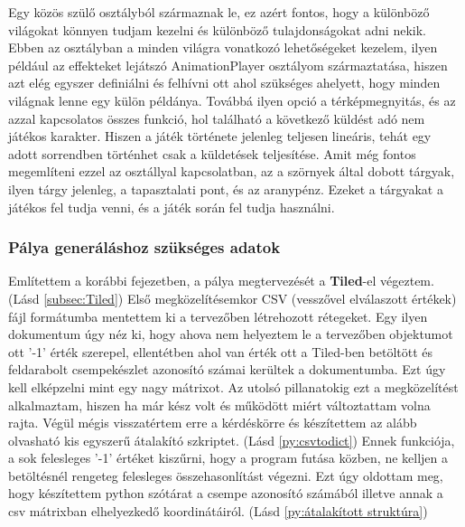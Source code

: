 Egy közös szülő osztályból származnak le, ez azért fontos, hogy a különböző világokat könnyen tudjam kezelni és különböző tulajdonságokat adni nekik. Ebben az osztályban a minden világra vonatkozó lehetőségeket kezelem, ilyen például az effekteket lejátszó AnimationPlayer osztályom származtatása, hiszen azt elég egyszer definiálni és felhívni ott ahol szükséges ahelyett, hogy minden világnak lenne egy külön példánya. Továbbá ilyen opció a térképmegnyitás, és az azzal kapcsolatos összes funkció, hol található a következő küldést adó nem játékos karakter. Hiszen a játék története jelenleg teljesen lineáris, tehát egy adott sorrendben történhet csak a küldetések teljesítése. Amit még fontos megemlíteni ezzel az osztállyal kapcsolatban, az a szörnyek által dobott tárgyak, ilyen tárgy jelenleg, a tapasztalati pont, és az aranypénz. Ezeket a tárgyakat a játékos fel tudja venni, és a játék során fel tudja használni.  

\subsubsection{Pálya generáláshoz szükséges adatok}

Említettem a korábbi fejezetben, a pálya megtervezését a \textbf{Tiled}-el végeztem. (Lásd \ref{subsec:Tiled}) 
Első megközelítésemkor CSV (vesszővel elválaszott értékek) fájl formátumba mentettem ki a tervezőben létrehozott rétegeket. Egy ilyen dokumentum úgy néz ki, hogy ahova nem helyeztem le a tervezőben objektumot ott '-1' érték szerepel, ellentétben ahol van érték ott a Tiled-ben betöltött és feldarabolt csempekészlet azonosító számai kerültek a dokumentumba. Ezt úgy kell elképzelni mint egy nagy mátrixot. Az utolsó pillanatokig ezt a megközelítést alkalmaztam, hiszen ha már kész volt és működött miért változtattam volna rajta. Végül mégis visszatértem erre a kérdéskörre és készítettem az alább olvasható kis egyszerű átalakító szkriptet. (Lásd \ref{py:csvtodict}) Ennek funkciója, a sok felesleges '-1' értéket kiszűrni, hogy a program futása közben, ne kelljen a betöltésnél rengeteg felesleges összehasonlítást végezni. Ezt úgy oldottam meg, hogy készítettem python szótárat a csempe azonosító számából illetve annak a csv mátrixban elhelyezkedő koordinátáiról. (Lásd \ref{py:átalakított struktúra})


